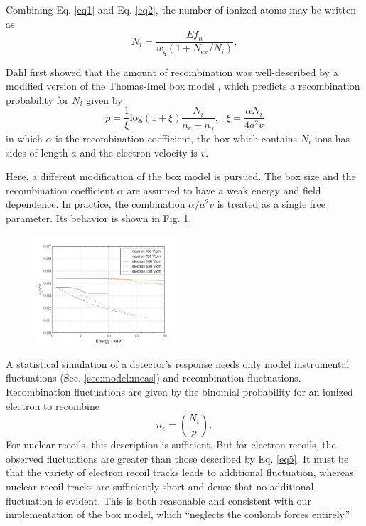 \documentclass[article]{revtex4-1}[11pt]
\begin{document}
Combining Eq. \ref{eq1} and Eq. \ref{eq2}, the  number of ionized atoms may be written as
\begin{equation} \label{eq3}
N_i = \frac{E f_n}{w_q(1+N_{ex}/N_i)},
\end{equation}

Dahl first showed \cite{Dahl:2009nta} that the amount of recombination was well-described by a modified version of the Thomas-Imel box model \cite{Thomas:1987zz}, which predicts a recombination probability for $N_i$ given by
\begin{equation}\label{eq4}
p = \frac{1}{\xi} \mbox{log}(1+\xi) \frac{N_i}{n_e+n_{\gamma}}, ~~~ \xi = \frac{\alpha N_i}{4a^2v}
\end{equation}
in which $\alpha$ is the recombination coefficient, the box which contains $N_i$ ions has sides of length $a$ and the electron velocity is $v$.

Here, a different modification of the box model is pursued. The box size and the recombination coefficient $\alpha$ are assumed to have a weak energy and field dependence. In practice, the combination $\alpha/a^2v$ is treated as a single free parameter. Its behavior is shown in Fig. \ref{yields}. 
\begin{figure}[h]
\begin{center}
\vskip -0.0cm
\includegraphics[width=0.48\textwidth]{figs/yields.pdf}
\vskip -0.1cm
\caption{}
\vskip -0.5cm
\label{yields}
\end{center}
\end{figure} 

A statistical simulation of a detector's response needs only model instrumental fluctuations (Sec. \ref{sec:model:meas}) and recombination fluctuations. Recombination fluctuations are given by the binomial probability for an ionized electron to recombine
\begin{equation}\label{eq5}
n_e = \binom{N_i}{p},
\end{equation}
For nuclear recoils, this description is sufficient. But for electron recoils, the observed fluctuations are greater than those described by Eq. \ref{eq5}. It must be that the variety of electron recoil tracks leads to additional fluctuation, whereas nuclear recoil tracks are sufficiently short and dense that no additional fluctuation is evident. This is both reasonable and consistent with our implementation of the box model, which ``neglects the coulomb forces entirely.'' 
\end{document}
